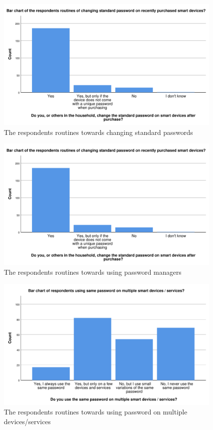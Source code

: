 \begin{figure}[H]
    \centering
    \includegraphics[scale=0.55]{figures/diagrams/standard_password.pdf}
    \caption{The respondents routines towards changing standard passwords}
    \label{fig:standard_password}
\end{figure}

\begin{figure}[H]
    \centering
    \includegraphics[scale=0.55]{figures/diagrams/standard_password.pdf}
    \caption{The respondents routines towards using password managers}
    \label{fig:standard_password}
\end{figure}

\begin{figure}[H]
    \centering
    \includegraphics[scale=0.55]{figures/diagrams/password_reuse.pdf}
    \caption{The respondents routines towards using password on multiple devices/services}
    \label{fig:password_reuse}
\end{figure}

